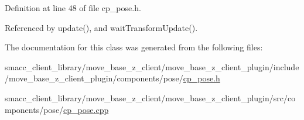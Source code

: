 Definition at line 48 of file cp\+\_\+pose.\+h.



Referenced by update(), and wait\+Transform\+Update().



The documentation for this class was generated from the following files\+:\begin{DoxyCompactItemize}
\item 
smacc\+\_\+client\+\_\+library/move\+\_\+base\+\_\+z\+\_\+client/move\+\_\+base\+\_\+z\+\_\+client\+\_\+plugin/include/move\+\_\+base\+\_\+z\+\_\+client\+\_\+plugin/components/pose/\hyperlink{cp__pose_8h}{cp\+\_\+pose.\+h}\item 
smacc\+\_\+client\+\_\+library/move\+\_\+base\+\_\+z\+\_\+client/move\+\_\+base\+\_\+z\+\_\+client\+\_\+plugin/src/components/pose/\hyperlink{cp__pose_8cpp}{cp\+\_\+pose.\+cpp}\end{DoxyCompactItemize}
